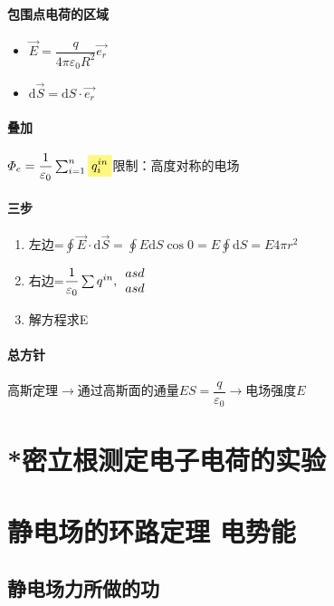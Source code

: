 \documentclass[UTF8,a4paper,12pt,scheme=chinese]{ctexbook}
\newcommand{\sll}[1]{\overrightarrow{#1}}
\newcommand{\ud}{\mathrm{d}}
\newcommand{\hla}[1]{%
	\colorbox{yellow!50}{$\displaystyle#1$}}
\begin{document}
	\paragraph{包围点电荷的区域}\begin{itemize}
		\item $ \sll{E}=\dfrac{q}{4\pi\varepsilon_0R^2}\sll{e_r} $
		\item $ \ud \sll{S}=\ud S\cdot\sll{e_r} $
	\end{itemize}
	\paragraph{叠加} $ \varPhi_e=\dfrac{1}{\varepsilon_0}\sum_{i=1}^n \hla{q_i^{in}} $限制：高度对称的电场
	\paragraph{三步}
	\begin{enumerate}
		\item 左边=$ \oint\sll{E}\cdot\ud\sll{S} = \oint E \ud S \cos 0 = E \oint \ud S = E4\pi r^2 $
		\item 右边=$ \dfrac{1}{\varepsilon_0}\sum q^{in}, \begin{array}{c c}
		asd\\asd
		\end{array}$
		\item 解方程求E
	\end{enumerate}
	\paragraph{总方针}高斯定理$ \rightarrow $通过高斯面的通量$ES=\dfrac{q}{\varepsilon_0}  $$ \rightarrow $电场强度$ E $
	\section{*密立根测定电子电荷的实验}
	\section{静电场的环路定理 电势能}
	\subsection{静电场力所做的功}
\end{document}
